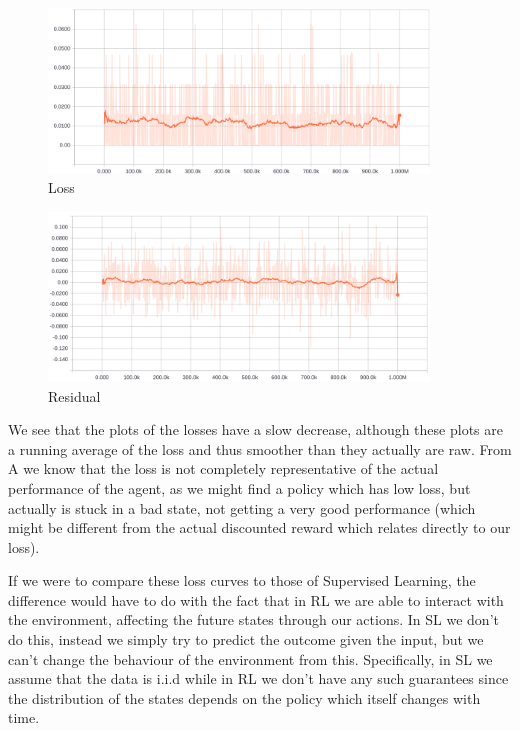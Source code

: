 \documentclass{article}
\begin{document}
\begin{figure}[H]
  \centering
  \includegraphics[width=0.9\textwidth]{B3/boxing_loss.png}
  \caption{Loss}
\end{figure}

\begin{figure}[H]
  \centering
  \includegraphics[width=0.9\textwidth]{B3/boxing_residual.png}
  \caption{Residual}
\end{figure}

We see that the plots of the losses have a slow decrease, although these plots
are a running average of the loss and thus smoother than they actually are raw.
From A we know that the loss is not completely representative of the actual
performance of the agent, as we might find a policy which has low loss, but
actually is stuck in a bad state, not getting a very good performance (which
might be different from the actual discounted reward which relates directly to
our loss).

If we were to compare these loss curves to those of Supervised Learning, the
difference would have to do with the fact that in RL we are able to interact
with the environment, affecting the future states through our actions. In SL we
don't do this, instead we simply try to predict the outcome given the input, but
we can't change the behaviour of the environment from this. Specifically, in SL
we assume that the data is i.i.d while in RL we don't have any such guarantees
since the distribution of the states depends on the policy which itself changes
with time.
\end{document}
